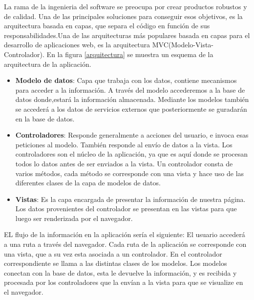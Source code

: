 La rama de la ingenieria del software se preocupa por crear productos robustos y de calidad. Una de las principales soluciones para conseguir esos objetivos, es la arquitectura basada en capas, que separa el código en función de sus responsabilidades.Una de las arquitecturas más populares basada en capas para el desarrollo de aplicaciones web, es la arquitectura MVC(Modelo-Vista-Controlador). En la figura \ref{arquitectura} se muestra un esquema de la arquitectura de la aplicación.

\begin{itemize}

\item \textbf{Modelo de datos}: Capa que trabaja con los datos, contiene mecanismos para acceder a la información. A través del modelo accederemos a la base de datos donde,estará la información almacenada. Mediante los modelos también se accederá a los datos de servicios externos que posteriormente se guradarán en la base de datos.

\item \textbf{Controladores}: Responde generalmente a acciones del usuario, e invoca esas peticiones al modelo. También responde al envío de datos a la vista. Los controladores son el núcleo de la aplicación, ya que es aquí donde se procesan todos lo datos antes de ser enviados a la vista. Un controlador consta de varios métodos, cada método se corresponde con una vista y hace uso de las diferentes clases de la capa de modelos de datos. 

\item \textbf{Vistas}: Es la capa encargada de presentar la información de nuestra página. Los datos provenientes del controlador se presentan en las vistas para que luego ser renderizada por el navegador.

\end{itemize}

 EL flujo de la información en la aplicación sería el siguiente: El usuario accederá a una ruta a través del navegador. Cada ruta de la aplicación se corresponde con una vista, que a su vez esta asociada a un controlador. En el controlador correspondiente se llama a las distintas clases de los modelos. Los modelos conectan con la base de datos, esta le devuelve la información, y es recibida y procesada por los controladores que la envían a la vista para que se visualize en el navegador. 



\vspace{5 mm}

